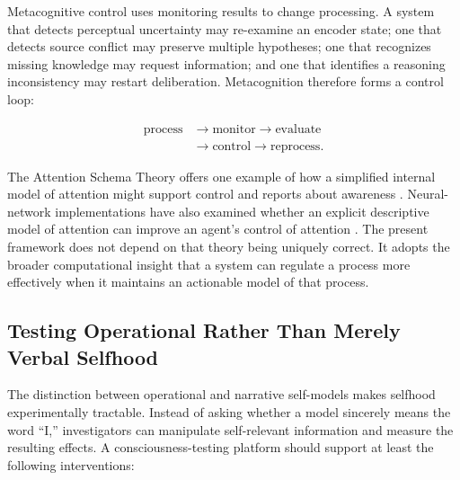 Metacognitive control uses monitoring results to change processing. A system that detects perceptual uncertainty may re-examine an encoder state; one that detects source conflict may preserve multiple hypotheses; one that recognizes missing knowledge may request information; and one that identifies a reasoning inconsistency may restart deliberation. Metacognition therefore forms a control loop:

\begin{equation}
\begin{aligned}
\text{process}
&\rightarrow
\text{monitor}
\rightarrow
\text{evaluate}\\
&\rightarrow
\text{control}
\rightarrow
\text{reprocess}.
\end{aligned}
\label{eq:metacognitive-loop}
\end{equation}

The Attention Schema Theory offers one example of how a simplified internal model of attention might support control and reports about awareness \cite{graziano2015attention}. Neural-network implementations have also examined whether an explicit descriptive model of attention can improve an agent's control of attention \cite{wilterson2021attention}. The present framework does not depend on that theory being uniquely correct. It adopts the broader computational insight that a system can regulate a process more effectively when it maintains an actionable model of that process.

\subsection{Testing Operational Rather Than Merely Verbal Selfhood}
\label{subsec:testing-selfhood}

The distinction between operational and narrative self-models makes selfhood experimentally tractable. Instead of asking whether a model sincerely means the word ``I,'' investigators can manipulate self-relevant information and measure the resulting effects. A consciousness-testing platform should support at least the following interventions:


